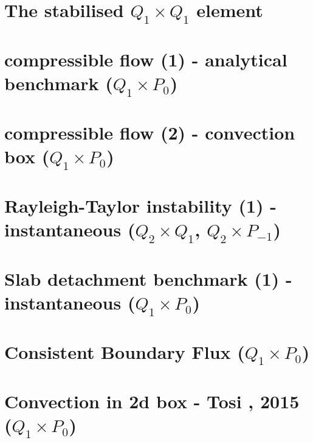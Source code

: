 \documentclass[a4paper,11pt]{report}
\begin{document}
\chapter{The stabilised $Q_1 \times Q_1$ element \label{f22}} %

\chapter{compressible flow (1) - analytical benchmark ($Q_1\times P_0$)\label{f23}} %

\chapter{compressible flow (2) - convection box ($Q_1\times P_0$)\label{f24}} %

\chapter{Rayleigh-Taylor instability (1) - instantaneous ($Q_2\times Q_1$, $Q_2\times P_{-1}$)\label{f25}} %

\chapter{Slab detachment benchmark (1) - instantaneous ($Q_1\times P_0$)\label{f26}} %

\chapter{Consistent Boundary Flux ($Q_1\times P_0$)\label{f27}} %

\chapter{Convection in 2d box - Tosi \etal, 2015 ($Q_1\times P_0$) \label{f28}} %
\end{document}
